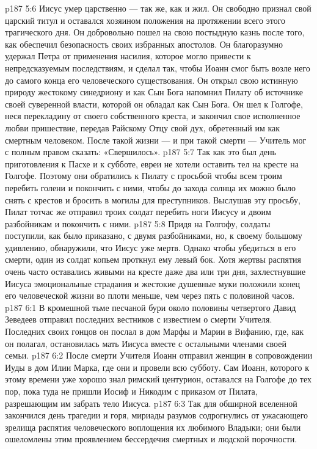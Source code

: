 \vs p187 5:6 \pc Иисус умер царственно --- так же, как и жил. Он свободно признал свой царский титул и оставался хозяином положения на протяжении всего этого трагического дня. Он добровольно пошел на свою постыдную казнь после того, как обеспечил безопасность своих избранных апостолов. Он благоразумно удержал Петра от применения насилия, которое могло привести к непредсказуемым последствиям, и сделал так, чтобы Иоанн смог быть возле него до самого конца его человеческого существования. Он открыл свою истинную природу жестокому синедриону и как Сын Бога напомнил Пилату об источнике своей суверенной власти, которой он обладал как Сын Бога. Он шел к Голгофе, неся перекладину от своего собственного креста, и закончил свое исполненное любви пришествие, передав Райскому Отцу свой дух, обретенный им как смертным человеком. После такой жизни --- и при такой смерти --- Учитель мог с полным правом сказать: «Свершилось».
\vs p187 5:7 \pc Так как это был день приготовления к Пасхе и к субботе, евреи не хотели оставить тел на кресте на Голгофе. Поэтому они обратились к Пилату с просьбой чтобы всем троим перебить голени и покончить с ними, чтобы до захода солнца их можно было снять с крестов и бросить в могилы для преступников. Выслушав эту просьбу, Пилат тотчас же отправил троих солдат перебить ноги Иисусу и двоим разбойникам и покончить с ними.
\vs p187 5:8 Придя на Голгофу, солдаты поступили, как было приказано, с двумя разбойниками, но, к своему большому удивлению, обнаружили, что Иисус уже мертв. Однако чтобы убедиться в его смерти, один из солдат копьем проткнул ему левый бок. Хотя жертвы распятия очень часто оставались живыми на кресте даже два или три дня, захлестнувшие Иисуса эмоциональные страдания и жестокие душевные муки положили конец его человеческой жизни во плоти меньше, чем через пять с половиной часов.
\vs p187 6:1 В кромешной тьме песчаной бури около половины четвертого Давид Зеведеев отправил последних вестников с известием о смерти Учителя. Последних своих гонцов он послал в дом Марфы и Марии в Вифанию, где, как он полагал, остановилась мать Иисуса вместе с остальными членами своей семьи.
\vs p187 6:2 После смерти Учителя Иоанн отправил женщин в сопровождении Иуды в дом Илии Марка, где они и провели всю субботу. Сам Иоанн, которого к этому времени уже хорошо знал римский центурион, оставался на Голгофе до тех пор, пока туда не пришли Иосиф и Никодим с приказом от Пилата, разрешающим им забрать тело Иисуса.
\vs p187 6:3 Так для обширной вселенной закончился день трагедии и горя, мириады разумов содрогнулись от ужасающего зрелища распятия человеческого воплощения их любимого Владыки; они были ошеломлены этим проявлением бессердечия смертных и людской порочности.
